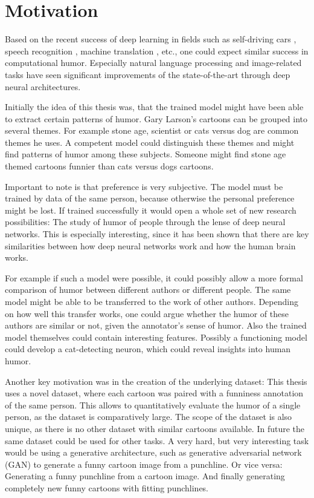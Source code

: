 \documentclass[draft,final,oneside]{vutinfth} %
\begin{document}
\section{Motivation}

Based on the recent success of deep learning in fields such as self-driving cars \cite{selfdriving}, speech recognition \cite{speech}, machine translation \cite{nmt}, etc., one could expect similar success in computational humor. Especially natural language processing and image-related tasks have seen significant improvements of the state-of-the-art through deep neural architectures.

Initially the idea of this thesis was, that the trained model might have been able to extract certain patterns of humor. Gary Larson's cartoons can be grouped into several themes. For example stone age, scientist or cats versus dog are common themes he uses. A competent model could distinguish these themes and might find patterns of humor among these subjects. Someone might find stone age themed cartoons funnier than cats versus dogs cartoons. 

Important to note is that preference is very subjective. The model must be trained by data of the same person, because otherwise the personal preference might be lost. If trained successfully it would open a whole set of new research possibilities: The study of humor of people through the lense of deep neural networks. This is especially interesting, since it has been shown that there are key similarities between how deep neural networks work and how the human brain works. \cite{Cichy2016}

For example if such a model were possible, it could possibly allow a more formal comparison of humor between different authors or different people.
The same model might be able to be transferred to the work of other authors. Depending on how well this transfer works, one could argue whether the humor of these authors are similar or not, given the annotator's sense of humor. Also the trained model themselves could contain interesting features. Possibly a functioning model could develop a cat-detecting neuron, which could reveal insights into human humor.

Another key motivation was in the creation of the underlying dataset: This thesis uses a novel dataset, where each cartoon was paired with a funniness annotation of the same person. This allows to quantitatively evaluate the humor of a single person, as the dataset is comparatively large. The scope of the dataset is also unique, as there is no other dataset with similar cartoons available. In future the same dataset could be used for other tasks. A very hard, but very interesting task would be using a generative architecture, such as generative adversarial network (GAN) to generate a funny cartoon image from a punchline. Or vice versa: Generating a funny punchline from a cartoon image. And finally generating completely new funny cartoons with fitting punchlines.\cite{gan2}\cite{gan}
\end{document}

